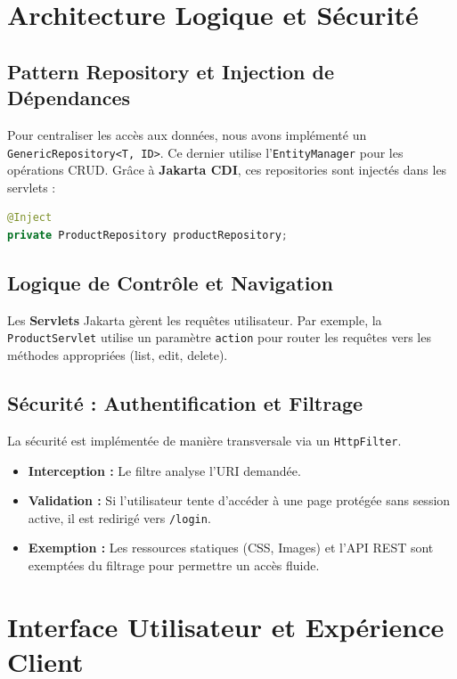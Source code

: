 \documentclass[12pt,a4paper]{report}
\begin{document}
\chapter{Architecture Logique et Sécurité}

\section{Pattern Repository et Injection de Dépendances}
Pour centraliser les accès aux données, nous avons implémenté un \texttt{GenericRepository<T, ID>}. Ce dernier utilise l'\texttt{EntityManager} pour les opérations CRUD. Grâce à \textbf{Jakarta CDI}, ces repositories sont injectés dans les servlets :

\begin{lstlisting}[language=Java]
@Inject
private ProductRepository productRepository;
\end{lstlisting}

\section{Logique de Contrôle et Navigation}
Les \textbf{Servlets} Jakarta gèrent les requêtes utilisateur. Par exemple, la \texttt{ProductServlet} utilise un paramètre \texttt{action} pour router les requêtes vers les méthodes appropriées (list, edit, delete).

\section{Sécurité : Authentification et Filtrage}
La sécurité est implémentée de manière transversale via un \texttt{HttpFilter}.
\begin{itemize}
    \item \textbf{Interception :} Le filtre analyse l'URI demandée.
    \item \textbf{Validation :} Si l'utilisateur tente d'accéder à une page protégée sans session active, il est redirigé vers \texttt{/login}.
    \item \textbf{Exemption :} Les ressources statiques (CSS, Images) et l'API REST sont exemptées du filtrage pour permettre un accès fluide.
\end{itemize}

\chapter{Interface Utilisateur et Expérience Client}
\end{document}
